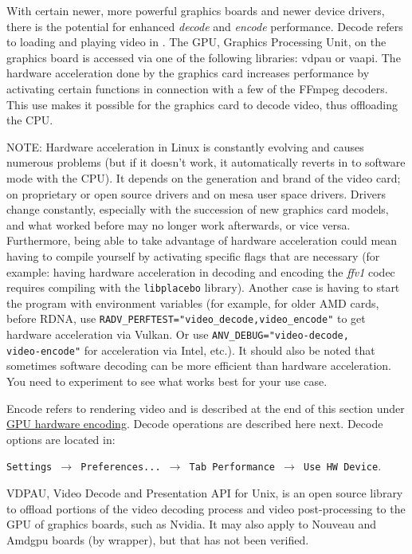 With certain newer, more powerful graphics boards and newer device drivers, there is the potential for enhanced \textit{decode} and \textit{encode} performance.   Decode refers to loading and playing video in \CGG{}. The GPU, Graphics Processing Unit, on the graphics board is accessed via one of the following libraries: vdpau or vaapi. The hardware acceleration done by the graphics card increases performance by activating certain functions in connection with a few of the FFmpeg decoders. This use makes it possible for the graphics card to decode video, thus offloading the CPU.

NOTE: Hardware acceleration in Linux is constantly evolving and causes numerous problems (but if it doesn't work, it automatically reverts in \CGG{} to software mode with the CPU). It depends on the generation and brand of the video card; on proprietary or open source drivers and on mesa user space drivers. Drivers change constantly, especially with the succession of new graphics card models, and what worked before may no longer work afterwards, or vice versa. Furthermore, being able to take advantage of hardware acceleration could mean having to compile \CGG{} yourself by activating specific flags that are necessary (for example: having hardware acceleration in decoding and encoding the \textit{ffv1} codec requires compiling with the \texttt{libplacebo} library). Another case is having to start the program with environment variables (for example, for older AMD cards, before RDNA, use \texttt{RADV\_PERFTEST="video\_decode,video\_encode"} to get hardware acceleration via Vulkan. Or use \texttt{ANV\_DEBUG="video-decode,\\video-encode"} for acceleration via Intel, etc.). It should also be noted that sometimes software decoding can be more efficient than hardware acceleration. You need to experiment to see what works best for your use case.

Encode refers to rendering video and is described at the end of this section
under \hyperref[sub:gpu_hardware_encoding]{GPU hardware encoding}. Decode operations are described here next.  Decode options are located in:

\texttt{Settings $\rightarrow$ Preferences... $\rightarrow$ Tab Performance $\rightarrow$ Use HW Device}. 

VDPAU, Video Decode and Presentation API for Unix, is an open source library to offload portions of the video decoding process and video post-processing to the GPU of graphics boards, such as Nvidia.  It may also apply to Nouveau and Amdgpu boards (by wrapper), but that has not been verified.

